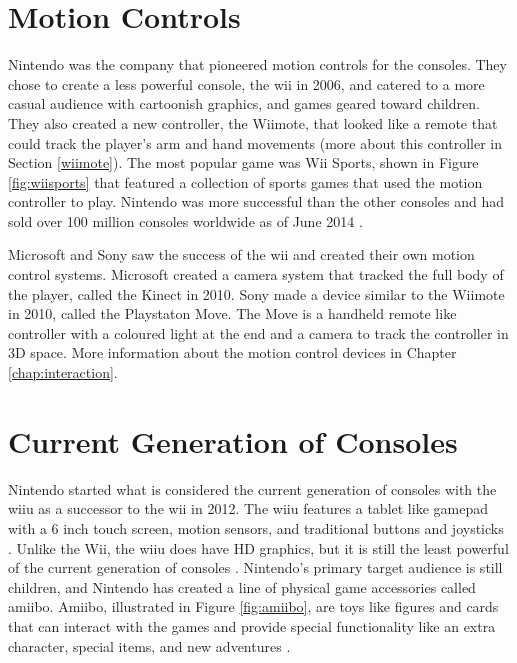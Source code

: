
\section{Motion Controls}
Nintendo was the company that pioneered motion controls for the consoles. They chose to create a less powerful console, the \gls{wii} in 2006, and catered to a more casual audience with cartoonish graphics, and games geared toward children. They also created a new controller, the Wiimote, that looked like a remote that could track the player's arm and hand movements (more about this controller in Section \ref{wiimote}). The most popular game was Wii Sports, shown in Figure \ref{fig:wiisports} that featured a collection of sports games that used the motion controller to play. Nintendo was more successful than the other consoles and had sold over 100 million consoles worldwide as of June 2014 \cite{2014nintendo}.

Microsoft and Sony saw the success of the \gls{wii} and created their own motion control systems. Microsoft created a camera system that tracked the full body of the player, called the Kinect in 2010. Sony made a device similar to the Wiimote in 2010, called the Playstaton Move. The Move is a handheld remote like controller with a coloured light at the end and a camera to track the controller in 3D space. More information about the motion control devices in Chapter \ref{chap:interaction}.


\section{Current Generation of Consoles}
Nintendo started what is considered the current generation of consoles with the \gls{wiiu} as a successor to the \gls{wii} in 2012. The \gls{wiiu} features a tablet like gamepad with a 6 inch touch screen, motion sensors, and traditional buttons and joysticks \cite{2015wiiu}. Unlike the Wii, the \gls{wiiu} does have HD graphics, but it is still the least powerful of the current generation of consoles \cite{2015ign}. Nintendo's primary target audience is still children, and Nintendo has created a line of physical game accessories called amiibo. Amiibo, illustrated in Figure \ref{fig:amiibo}, are toys like figures and cards that can interact with the games and provide special functionality like an extra character, special items, and new adventures \cite{2015amiibo}. 

